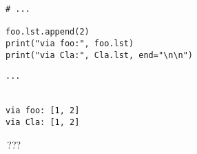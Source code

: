 
\begin{frame}[fragile]
%
\begin{tcbraster}[raster columns=2,
                  raster equal height,
                  nobeforeafter,
                  raster column skip=0.5cm]
\begin{codebox}[(... continued ...)]
\begin{verbatim}
# ...

foo.lst.append(2)
print("via foo:", foo.lst)
print("via Cla:", Cla.lst, end="\n\n")
\end{verbatim}
\end{codebox}
%
\begin{cmdbox}[(... continued ...)]
\begin{verbatim}
...


via foo: [1, 2]
via Cla: [1, 2]
\end{verbatim}
\end{cmdbox}
\end{tcbraster}
%
\vspace{15pt}
%
\begin{center}
	\Thus\,???
\end{center}
%
\end{frame}


